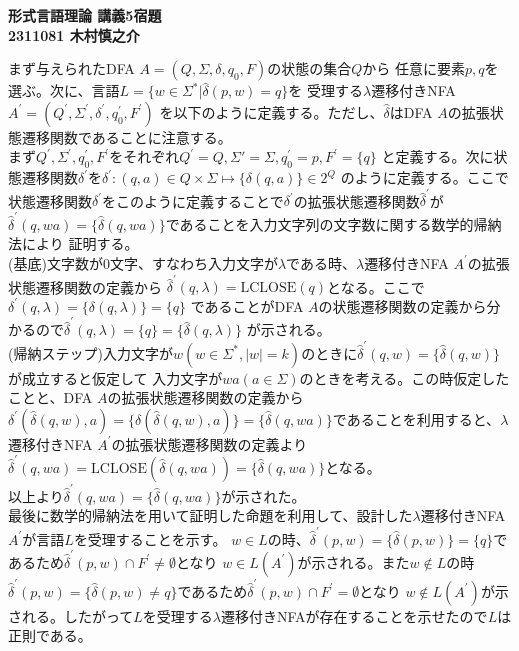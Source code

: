 \documentclass[uplatex,dvipdfmx,a4paper,10pt]{jsarticle}
\begin{document}
    \begin{center}
        {\Large{\bf 形式言語理論 講義5宿題}} \\
        {\bf 2311081 木村慎之介} \\
    \end{center}

    まず与えられたDFA $A = (Q, \Sigma, \delta, q_0, F)$の状態の集合$Q$から
    任意に要素$p,q$を選ぶ。次に、言語$L = \{w \in \Sigma^{*} | \hat{\delta}(p, w) = q \}$を
    受理する$\lambda$遷移付きNFA $A^{'} = (Q^{'}, \Sigma^{'}, \delta^{'}, q_{0}^{'}, F^{'})$
    を以下のように定義する。ただし、$\hat{\delta}$はDFA $A$の拡張状態遷移関数であることに注意する。 \\ \indent
    まず$Q^{'}, \Sigma^{'}, q_0^{'}, F^{'}$をそれぞれ$Q^{'} = Q,\Sigma{'} = \Sigma,q_0^{'} = p,F^{'} = \{ q \}$
    と定義する。次に状態遷移関数$\delta^{'}$を$\delta^{'}: (q, a) \in Q \times \Sigma \mapsto \{ \delta(q, a) \} \in 2^{Q}$
    のように定義する。ここで状態遷移関数$\delta^{'}$をこのように定義することで$\delta^{'}$の拡張状態遷移関数$\hat{\delta}^{'}$が
    $\hat{\delta}^{'}(q,wa) = \{\hat{\delta}(q, wa)\}$であることを入力文字列の文字数に関する数学的帰納法により
    証明する。 \\ \indent
    (基底)文字数が$0$文字、すなわち入力文字が$\lambda$である時、$\lambda$遷移付きNFA $A^{'}$の拡張状態遷移関数の定義から
    $\hat{\delta}^{'}(q, \lambda) = \text{LCLOSE}(q)$となる。ここで$\delta^{'}(q, \lambda) = \{ \delta(q, \lambda) \} = \{ q \}$
    であることがDFA $A$の状態遷移関数の定義から分かるので$\hat{\delta}^{'}(q, \lambda) = \{ q \} = \{ \hat{\delta}(q, \lambda) \}$
    が示される。 \\ \indent
    (帰納ステップ)入力文字が$w(w \in \Sigma^{*}, |w| = k)$のときに$\hat{\delta}^{'}(q, w) = \{ \hat{\delta}(q, w) \}$が成立すると仮定して
    入力文字が$wa(a \in \Sigma)$のときを考える。この時仮定したことと、DFA $A$の拡張状態遷移関数の定義から$\delta^{'}(\hat{\delta}(q, w), a) = \{ \delta(\hat{\delta}(q, w), a) \} = \{ \hat{\delta}(q, wa) \}$であることを利用すると、$\lambda$遷移付きNFA $A^{'}$の拡張状態遷移関数の定義より
    $\hat{\delta}^{'}(q, wa) = \text{LCLOSE}(\hat{\delta}(q, wa)) = \{ \hat{\delta}(q, wa) \}$となる。 \\ \indent
    以上より$\hat{\delta}^{'}(q, wa) = \{ \hat{\delta}(q, wa) \}$が示された。\\ \indent
    最後に数学的帰納法を用いて証明した命題を利用して、設計した$\lambda$遷移付きNFA $A^{'}$が言語$L$を受理することを示す。
    $w \in L$の時、$\hat{\delta}^{'}(p, w) = \{ \hat{\delta}(p, w) \} = \{ q \}$であるため$\hat{\delta}^{'}(p, w) \cap F^{'} \neq \emptyset$となり
    $w \in L(A^{'})$が示される。また$w \notin L$の時$\hat{\delta}^{'}(p, w) = \{ \hat{\delta}(p, w) \neq q \}$であるため$\hat{\delta}^{'}(p, w) \cap F^{'} = \emptyset$となり
    $w \notin L(A^{'})$が示される。したがって$L$を受理する$\lambda$遷移付きNFAが存在することを示せたので$L$は正則である。
\end{document}
